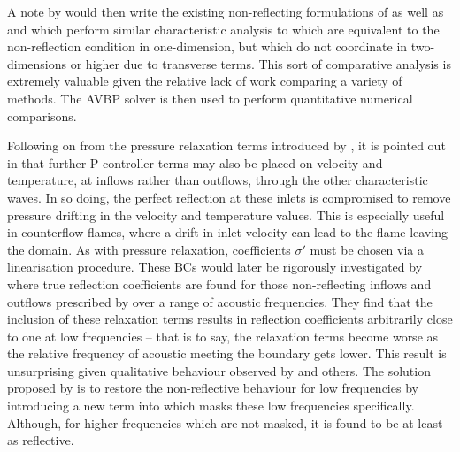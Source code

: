 A note by \cite{nicoud1999DefiningWaveAmplitude} would then write the existing non-reflecting formulations of \cite{thompson1990TimeDependentBoundaryConditions,poinsot1992BoundaryConditionsDirect} as well as \cite{hirsch1990NumericalComputationInternal} and \cite{giles1990NonreflectingBoundaryConditions} which perform similar characteristic analysis to \cite{thompson1990TimeDependentBoundaryConditions,poinsot1992BoundaryConditionsDirect} which are equivalent to the non-reflection condition  in one-dimension, but which do not coordinate in two-dimensions or higher due to transverse terms. This sort of comparative analysis is extremely valuable given the relative lack of work comparing a variety of methods. The AVBP solver \cite{cerfacsAVBP} is then used to perform quantitative numerical comparisons.

Following on from the pressure relaxation terms introduced by \cite{rudy1980NonreflectingOutflowBoundary}, it is pointed out in \cite{poinsot2001TheoreticalNumericalCombustion} that further P-controller terms may also be placed on velocity and temperature, at inflows rather than outflows, through the other characteristic waves. In so doing, the perfect reflection at these inlets is compromised to remove pressure drifting in the velocity and temperature values. This is especially useful in counterflow flames, where a drift in inlet velocity can lead to the flame leaving the domain. As with pressure relaxation, coefficients $σ'$ must be chosen via a linearisation procedure. These BCs would later be rigorously investigated by \cite{polifke2006PartiallyReflectingNonreflecting} where true reflection coefficients are found for those non-reflecting inflows and outflows prescribed by \cite{poinsot2001TheoreticalNumericalCombustion} over a range of acoustic frequencies. They find that the inclusion of these relaxation terms results in reflection coefficients arbitrarily close to one at low frequencies -- that is to say, the relaxation terms become worse as the relative frequency of acoustic meeting the boundary gets lower. This result is unsurprising given qualitative behaviour observed by \cite{poinsot1992BoundaryConditionsDirect} and others. The solution proposed by \cite{polifke2006PartiallyReflectingNonreflecting} is to restore the non-reflective behaviour for low frequencies by introducing a new term into  which masks these low frequencies specifically. Although, for higher frequencies which are not masked, it is found to be at least as reflective.

